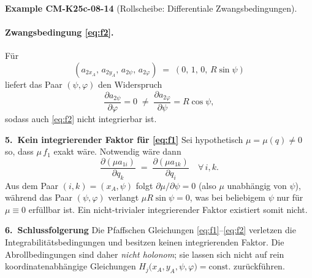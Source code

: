 \documentclass[10pt, letterpaper]{article}
\newcommand{\CustomHeading}[3]{%
  \par\medskip\noindent%
  \textbf{#1 #2} \textnormal{(#3)}.\enskip%
}
\newenvironment{EXA}[2]{\CustomHeading{Example}{#1}{#2}}{}
\begin{document}
\begin{EXA}{CM-K25c-08-14}{Rollscheibe: Differentiale Zwangsbedingungen}
\paragraph{Zwangsbedingung \eqref{eq:f2}.}
Für
\[
  (a_{2x_A},\,a_{2y_A},\,a_{2\psi},\,a_{2\varphi})
  \;=\;
  (0,\,1,\,0,\,R\sin\psi)
\]
liefert das Paar $(\psi,\varphi)$ den Widerspruch
\[
  \frac{\partial a_{2\psi}}{\partial\varphi}=0
  \;\neq\;
  \frac{\partial a_{2\varphi}}{\partial\psi}=R\cos\psi,
\]
sodass auch \eqref{eq:f2} nicht integrierbar ist.

\textbf{5.\ Kein integrierender Faktor für \eqref{eq:f1}}
Sei hypothetisch $\mu=\mu(q)\neq0$ so, dass $\mu\,f_1$ exakt wäre.
Notwendig wäre dann
\[
  \frac{\partial(\mu a_{1i})}{\partial q_k}
  \;=\;
  \frac{\partial(\mu a_{1k})}{\partial q_i}
  \quad\forall\,i,k.
\]
Aus dem Paar $(i,k)=(x_A,\psi)$ folgt
$\partial\mu/\partial\psi = 0$ (also $\mu$ unabhängig von $\psi$),
während das Paar $(\psi,\varphi)$ verlangt
\(
  \mu R\sin\psi = 0
\),
was bei beliebigem $\psi$ nur für $\mu\equiv0$ erfüllbar ist.
Ein nicht-trivialer integrierender Faktor existiert somit nicht.

\textbf{6.\ Schlussfolgerung}
Die Pfaffschen Gleichungen \eqref{eq:f1}–\eqref{eq:f2} verletzen die
Integrabilitätsbedingungen und besitzen keinen integrierenden Faktor.
Die Abrollbedingungen sind daher \emph{nicht holonom};
sie lassen sich nicht auf rein
koordinatenabhängige Gleichungen
\(
  H_j\bigl(x_A,y_A,\psi,\varphi\bigr)=\text{const.}
\)
zurückführen.
\end{EXA}
\end{document}
